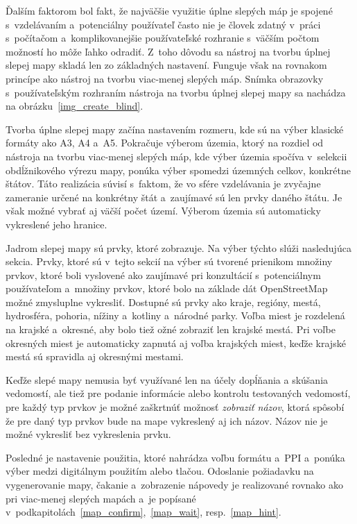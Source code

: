 Ďalším faktorom bol fakt, že najväčšie využitie úplne slepých máp je spojené s~vzdelávaním a~potenciálny používateľ často nie je človek zdatný v~práci s~počítačom a~komplikovanejšie používateľské rozhranie s~väčším počtom možností ho môže ľahko odradiť. Z~toho dôvodu sa nástroj na tvorbu úplnej slepej mapy skladá len zo základných nastavení. Funguje však na rovnakom princípe ako nástroj na tvorbu viac-menej slepých máp. Snímka obrazovky s~používateľským rozhraním nástroja na tvorbu úplnej slepej mapy sa nachádza na obrázku~\ref{img_create_blind}.

Tvorba úplne slepej mapy začína nastavením rozmeru, kde sú na výber klasické formáty ako A3, A4 a~A5. Pokračuje výberom územia, ktorý na rozdiel od nástroja na tvorbu viac-menej slepých máp, kde výber územia spočíva v~selekcii obdĺžnikového výrezu mapy, ponúka výber spomedzi územných celkov, konkrétne štátov. Táto realizácia súvisí s~faktom, že vo sfére vzdelávania je zvyčajne zameranie určené na konkrétny štát a~zaujímavé sú len prvky daného štátu. Je však možné vybrať aj väčší počet území. Výberom územia sú automaticky vykreslené jeho hranice. 

Jadrom slepej mapy sú prvky, ktoré zobrazuje. Na výber týchto slúži nasledujúca sekcia. Prvky, ktoré sú v~tejto sekcií na výber sú tvorené prienikom množiny prvkov, ktoré boli vyslovené ako zaujímavé pri konzultácií s~potenciálnym používateľom a~množiny prvkov, ktoré bolo na základe dát OpenStreetMap možné zmysluplne vykresliť. Dostupné sú prvky ako kraje, regióny, mestá, hydrosféra, pohoria, nížiny a~kotliny a~národné parky. Voľba miest je rozdelená na krajské a~okresné, aby bolo tiež ožné zobraziť len krajské mestá. Pri voľbe okresných miest je automaticky zapnutá aj voľba krajských miest, keďže krajské mestá sú spravidla aj okresnými mestami.

Keďže slepé mapy nemusia byť využívané len na účely dopĺňania a skúšania vedomostí, ale tiež pre podanie informácie alebo kontrolu testovaných vedomostí, pre každý typ prvkov je možné zaškrtnúť možnosť {\it zobraziť názov}, ktorá spôsobí že pre daný typ prvkov bude na mape vykreslený aj ich názov. Názov nie je možné vykresliť bez vykreslenia prvku.

Posledné je nastavenie použitia, ktoré nahrádza voľbu formátu a~PPI a~ponúka výber medzi digitálnym použitím alebo tlačou. Odoslanie požiadavku na vygenerovanie mapy, čakanie a~zobrazenie nápovedy je realizované rovnako ako pri viac-menej slepých mapách a~je popísané v~podkapitolách~\ref{map_confirm},~\ref{map_wait}, resp.~\ref{map_hint}.

